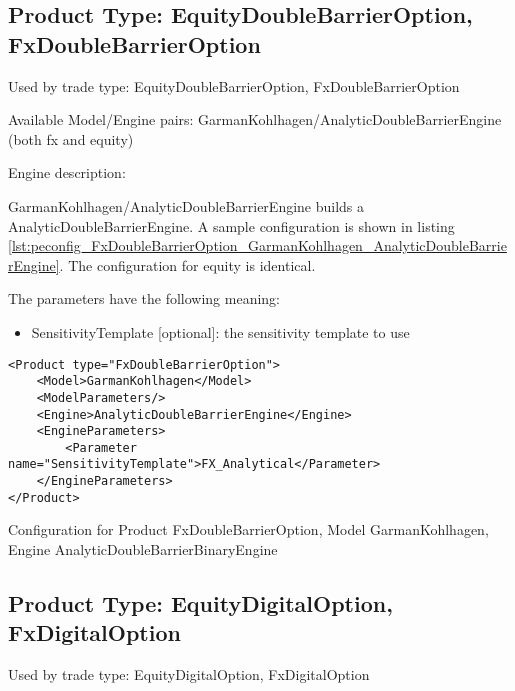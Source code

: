 \subsection{Product Type: EquityDoubleBarrierOption, FxDoubleBarrierOption}

Used by trade type: EquityDoubleBarrierOption, FxDoubleBarrierOption

Available Model/Engine pairs: GarmanKohlhagen/AnalyticDoubleBarrierEngine (both fx and equity)

Engine description:

GarmanKohlhagen/AnalyticDoubleBarrierEngine builds a AnalyticDoubleBarrierEngine. A sample configuration is shown in
listing \ref{lst:peconfig_FxDoubleBarrierOption_GarmanKohlhagen_AnalyticDoubleBarrierEngine}. The configuration for equity
is identical.

The parameters have the following meaning:

\begin{itemize}
\item SensitivityTemplate [optional]: the sensitivity template to use 
\end{itemize}

\begin{longlisting}
\begin{verbatim}
<Product type="FxDoubleBarrierOption">
    <Model>GarmanKohlhagen</Model>
    <ModelParameters/>
    <Engine>AnalyticDoubleBarrierEngine</Engine>
    <EngineParameters>
        <Parameter name="SensitivityTemplate">FX_Analytical</Parameter>
    </EngineParameters>
</Product>
\end{verbatim}
\caption{Configuration for Product FxDoubleBarrierOption, Model GarmanKohlhagen, Engine AnalyticDoubleBarrierBinaryEngine}
\label{lst:peconfig_FxDoubleBarrierOption_GarmanKohlhagen_AnalyticDoubleBarrierEngine}
\end{longlisting}


\subsection{Product Type: EquityDigitalOption, FxDigitalOption}

Used by trade type: EquityDigitalOption, FxDigitalOption

